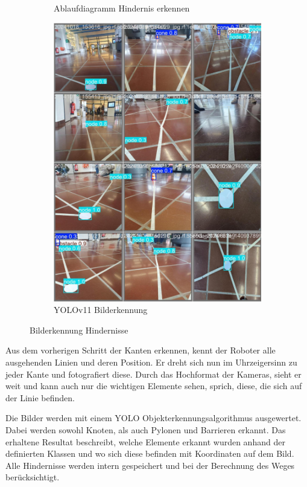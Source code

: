 \begin{figure}[H]
\begin{subfigure}{0.45\textwidth}
\caption{Ablaufdiagramm Hindernis erkennen}
\label{fig:ablaufdiagramm-hindernis-erkennen}
\end{subfigure}
\begin{subfigure}{0.55\textwidth}
\includegraphics[width=\textwidth]{assets/informatik-prototyp/yolo/recognized-images.jpeg}
\caption{YOLOv11 Bilderkennung}
\label{fig:img-recognition-yolo-concept}
\end{subfigure}
\caption{Bilderkennung Hindernisse}
\label{fig:image-detection-obstacles}
\end{figure}

Aus dem vorherigen Schritt der Kanten erkennen, kennt der Roboter alle ausgehenden Linien und deren Position. Er dreht sich nun im Uhrzeigersinn zu jeder Kante und fotografiert diese. Durch das Hochformat der Kameras, sieht er weit und kann auch nur die wichtigen Elemente sehen, sprich, diese, die sich auf der Linie befinden.

Die Bilder werden mit einem YOLO Objekterkennungsalgorithmus ausgewertet. Dabei werden sowohl Knoten, als auch Pylonen und Barrieren erkannt. Das erhaltene Resultat beschreibt, welche Elemente erkannt wurden anhand der definierten Klassen und wo sich diese befinden mit Koordinaten auf dem Bild.
Alle Hindernisse werden intern gespeichert und bei der Berechnung des Weges berücksichtigt.


